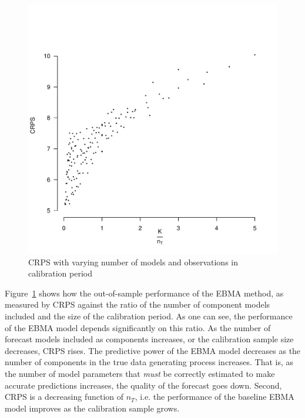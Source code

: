 \documentclass[12pt,fullpage,endnotes]{article}
\begin{document}
\begin{figure}[ht]
\caption{CRPS with varying number of models and observations in calibration period}
\label{simplot1}
\centering
\includegraphics[scale=.5]{2D}
\end{figure}

Figure~\ref{simplot1} shows how the out-of-sample performance of the
EBMA method, as measured by CRPS against the ratio of the number of component models included and the size of the calibration period. As one can see, the performance of the EBMA model depends significantly on this ratio. As the number of forecast models included as components increases, or the calibration sample size decreases, CRPS rises. The predictive power of the EBMA model decreases as the number of components in
the true data generating process increases. That is, as the number of
model parameters that \textit{must} be correctly estimated to make
accurate predictions increases, the quality of the forecast goes down. Second, CRPS is a decreasing function of $n_{T}$, i.e. the performance of the baseline EBMA model improves as the calibration sample grows.

\end{document}
